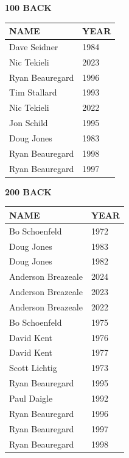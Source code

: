 \begin{table}[H]
\centering
\begin{minipage}[t]{0.48\textwidth}
\centering
\textbf{100 BACK}\\[0.1cm]
\begin{tabular}{@{}p{2.8cm}p{1.2cm}@{}}
\hline
    \textbf{NAME} & \textbf{YEAR} \\
\hline
    Dave Seidner & 1984 \\
    Nic Tekieli & 2023 \\
    Ryan Beauregard & 1996 \\
    Tim Stallard & 1993 \\
    Nic Tekieli & 2022 \\
    Jon Schild & 1995 \\
    Doug Jones & 1983 \\
    Ryan Beauregard & 1998 \\
    Ryan Beauregard & 1997 \\
\hline
\end{tabular}
\end{minipage}\hfill
\begin{minipage}[t]{0.48\textwidth}
\centering
\textbf{200 BACK}\\[0.1cm]
\begin{tabular}{@{}p{2.8cm}p{1.2cm}@{}}
\hline
    \textbf{NAME} & \textbf{YEAR} \\
\hline
    Bo Schoenfeld & 1972 \\
    Doug Jones & 1983 \\
    Doug Jones & 1982 \\
    Anderson Breazeale & 2024 \\
    Anderson Breazeale & 2023 \\
    Anderson Breazeale & 2022 \\
    Bo Schoenfeld & 1975 \\
    David Kent & 1976 \\
    David Kent & 1977 \\
    Scott Lichtig & 1973 \\
    Ryan Beauregard & 1995 \\
    Paul Daigle & 1992 \\
    Ryan Beauregard & 1996 \\
    Ryan Beauregard & 1997 \\
    Ryan Beauregard & 1998 \\
\hline
\end{tabular}
\end{minipage}
\end{table}

